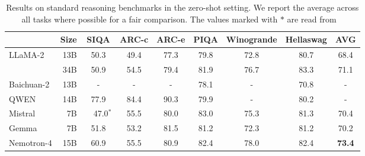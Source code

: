 \documentclass[11pt]{article}
\newcommand{\ours}{Nemotron-4}
\begin{document}
\begin{table}[H]
\centering
\begin{adjustbox}{max width=\textwidth, scale=1.0}
\begin{tabular}{lrccccccc}
\toprule
& Size & SIQA  & ARC-c & ARC-e & PIQA & Winogrande & Hellaswag & AVG \\ 
\midrule
\multirow{2}{*}{LLaMA-2} & 13B & 50.3 & 49.4 & 77.3 & 79.8 & 72.8 & 80.7 & 68.4 \\
& 34B & 50.9 & 54.5 & 79.4 & 81.9 & 76.7 & 83.3 & 71.1 \\
\midrule
\multirow{1}{*}{Baichuan-2} & 13B & - & - & - & 78.1 & - & 70.8 & - \\
\midrule
QWEN & 14B & 77.9 & 84.4 &90.3 & 79.9 & - & 80.2 & - \\
\midrule
Mistral  & 7B & \ \ 47.0$^{*}$ & 55.5 &80.0 & 83.0 & 75.3 & 81.3 & 70.4 \\
\midrule
Gemma & 7B & 51.8 & 53.2 & 81.5 & 81.2 & 72.3 & 81.2 & 70.2 \\
\midrule
\ours{} & 15B & 60.9 & 55.5 & 80.9 & 82.4 & 78.0 & 82.4 & \textbf{73.4} \\
\bottomrule
\end{tabular}
\end{adjustbox}
\caption{\label{tab:lm_eval_harness_external} Results on standard reasoning benchmarks in the zero-shot setting. We report the average across all tasks where possible for a fair comparison. The values marked with $*$ are read from ~\citet{gemma24} }
\end{table}

\end{document}
